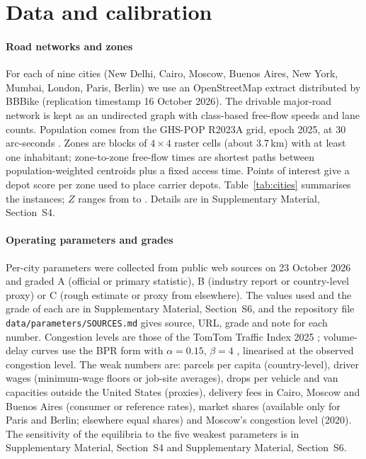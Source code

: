 \documentclass[preprint,11pt]{elsarticle}
\theoremstyle{definition}
\theoremstyle{remark}
\newcommand{\SM}[1]{Supplementary Material, Section~#1}
\begin{document}
\section{Data and calibration}\label{sec:data}

\paragraph{Road networks and zones} For each of nine cities (New Delhi, Cairo, Moscow, Buenos Aires, New York, Mumbai, London, Paris, Berlin) we use an OpenStreetMap extract \citep{Haklay2008} distributed by BBBike (replication timestamp 16 October 2026). The drivable major-road network is kept as an undirected graph with class-based free-flow speeds and lane counts. Population comes from the GHS-POP R2023A grid, epoch 2025, at 30 arc-seconds \citep{GHSPOP2023}. Zones are blocks of $4\times4$ raster cells (about 3.7\,km) with at least one inhabitant; zone-to-zone free-flow times are shortest paths between population-weighted centroids plus a fixed access time. Points of interest give a depot score per zone used to place carrier depots. Table~\ref{tab:cities} summarises the instances; $Z$ ranges from \Zmin{} to \Zmax. Details are in \SM{S4}.

\begin{table}[tbp]\centering\small
\caption{City instances. $Z$: zones; population from GHS-POP inside the zones; major road and lane kilometres inside the zones; nodes of the major-road graph; $N$: number of carriers.}\label{tab:cities}
\end{table}

\paragraph{Operating parameters and grades} Per-city parameters were collected from public web sources on 23 October 2026 and graded A (official or primary statistic), B (industry report or country-level proxy) or C (rough estimate or proxy from elsewhere). The values used and the grade of each are in \SM{S6}, and the repository file \texttt{data/parameters/SOURCES.md} gives source, URL, grade and note for each number. Congestion levels are those of the TomTom Traffic Index 2025 \citep{TomTom2025}; volume-delay curves use the BPR form with $\alpha=0.15$, $\beta=4$ \citep{BPR1964}, linearised at the observed congestion level. The weak numbers are: parcels per capita (country-level), driver wages (minimum-wage floors or job-site averages), drops per vehicle and van capacities outside the United States (proxies), delivery fees in Cairo, Moscow and Buenos Aires (consumer or reference rates), market shares (available only for Paris and Berlin; elsewhere equal shares) and Moscow's congestion level (2020). The sensitivity of the equilibria to the five weakest parameters is in \SM{S4} and \SM{S6}.
\end{document}

